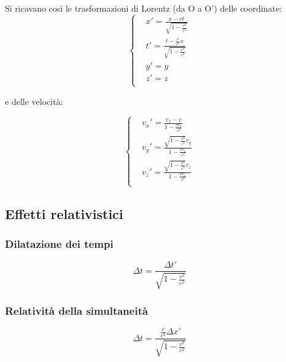 \documentclass{article}
\begin{document}
Si ricavano così le trasformazioni di Lorentz (da O a O') delle coordinate:
\begin{equation}
    \left\{
    \begin{aligned}
         & x'= \frac{x-vt}{\sqrt{1-\frac{v^2}{c^2}}}             \\
         & t'= \frac{t-\frac{v}{c^2}x}{\sqrt{1-\frac{v^2}{c^2}}} \\
         & y'=y                                                  \\
         & z'=z                                                  \\
    \end{aligned}
    \right.
\end{equation}

e delle velocità:

\begin{equation}
    \left\{
    \begin{aligned}
         & v_x' = \frac{v_x-v}{1-\frac{vv_x}{c^2}}                       \\
         & v_y' = \frac{\sqrt{1-\frac{v^2}{c^2}}v_y}{1-\frac{vv_x}{c^2}} \\
         & v_z' = \frac{\sqrt{1-\frac{v^2}{c^2}}v_z}{1-\frac{vv_x}{c^2}} \\
    \end{aligned}
    \right.
\end{equation}

\subsection{Effetti relativistici}

\subsubsection{Dilatazione dei tempi}

\begin{equation}
    \Delta t = \frac{\Delta t'}{\sqrt{1-\frac{v^2}{c^2}}}
\end{equation}

\subsubsection{Relatività della simultaneità}

\begin{equation}
    \Delta t = \frac{\frac{v}{c^2}\Delta x'}{\sqrt{1-\frac{v^2}{c^2}}}
\end{equation}
\end{document}
